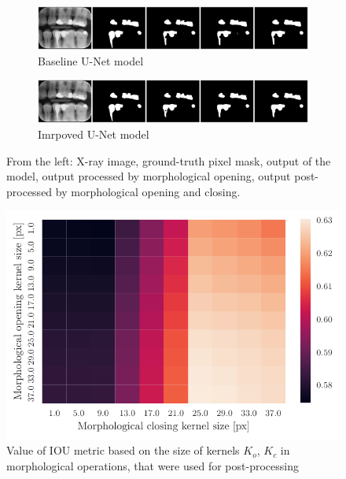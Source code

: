 \begin{figure}[H]
    \centering
    \begin{subfigure}[b]{\textwidth}
        \includegraphics[width=1\linewidth]{images/unet_1_img_12.pdf}
        \caption{Baseline U-Net model}
    \end{subfigure}

    \begin{subfigure}[b]{\textwidth}
        \includegraphics[width=1\linewidth]{images/unet_2_img_12.pdf}
        \caption{Imrpoved U-Net model}
    \end{subfigure}
    \caption{From the left: X-ray image, ground-truth pixel mask, output of the model, output processed by morphological opening, output post-processed by morphological opening and closing.}
\end{figure}

\begin{figure}[H]
    \centering
    \includegraphics[]{images/heatmap_of_unetpostproc_search.pdf}
    \caption{Value of IOU metric based on the size of kernels $K_o$, $K_c$ in morphological operations, that were used for post-processing}
    \label{fig:heatmap_postprocess}
\end{figure}

